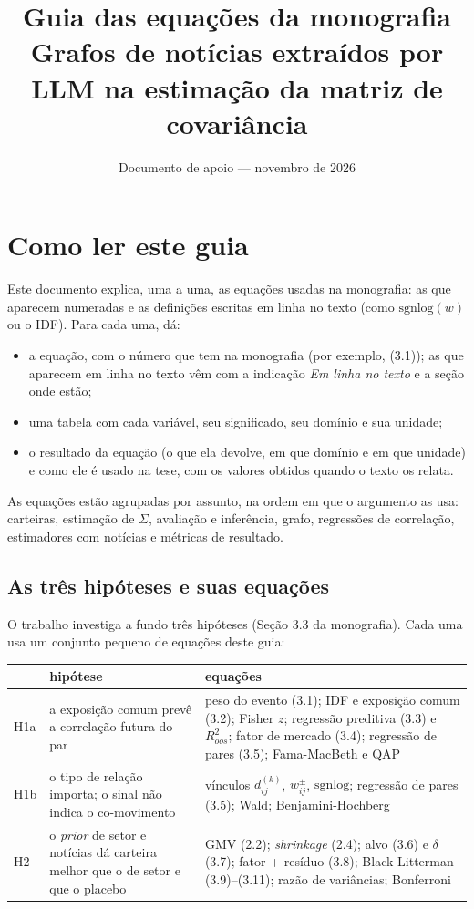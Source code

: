 \documentclass[11pt,a4paper]{article}
\title{Guia das equações da monografia\\[2pt]
\large Grafos de notícias extraídos por LLM na estimação da matriz de covariância}
\author{}
\date{Documento de apoio --- novembro de 2026}
\begin{document}
\maketitle

\tableofcontents
\clearpage

\section{Como ler este guia}

Este documento explica, uma a uma, as equações usadas na monografia: as que aparecem numeradas e as
definições escritas em linha no texto (como $\mathrm{sgnlog}(w)$ ou o IDF). Para cada uma, dá:
\begin{itemize}
  \item a equação, com o número que tem na monografia (por exemplo, (3.1)); as que aparecem em linha
        no texto vêm com a indicação \textit{Em linha no texto} e a seção onde estão;
  \item uma tabela com cada variável, seu significado, seu domínio e sua unidade;
  \item o resultado da equação (o que ela devolve, em que domínio e em que unidade) e como ele é usado
        na tese, com os valores obtidos quando o texto os relata.
\end{itemize}
As equações estão agrupadas por assunto, na ordem em que o argumento as usa: carteiras, estimação de
$\Sigma$, avaliação e inferência, grafo, regressões de correlação, estimadores com notícias e métricas
de resultado.

\subsection{As três hipóteses e suas equações}

O trabalho investiga a fundo três hipóteses (Seção 3.3 da monografia). Cada uma usa um conjunto pequeno
de equações deste guia:

\begin{center}
\small
\begin{tabularx}{\textwidth}{>{\raggedright\arraybackslash}p{1cm}>{\raggedright\arraybackslash}p{4.6cm}X}
\toprule
& hipótese & equações \\
\midrule
H1a & a exposição comum prevê a correlação futura do par & peso do evento (3.1); IDF e exposição comum (3.2); Fisher $z$; regressão preditiva (3.3) e $R^2_{oos}$; fator de mercado (3.4); regressão de pares (3.5); Fama-MacBeth e QAP \\
H1b & o tipo de relação importa; o sinal não indica o co-movimento & vínculos $d^{(k)}_{ij}$, $w^\pm_{ij}$, $\mathrm{sgnlog}$; regressão de pares (3.5); Wald; Benjamini-Hochberg \\
H2 & o \emph{prior} de setor e notícias dá carteira melhor que o de setor e que o placebo & GMV (2.2); \emph{shrinkage} (2.4); alvo (3.6) e $\delta$ (3.7); fator + resíduo (3.8); Black-Litterman (3.9)--(3.11); razão de variâncias; Bonferroni \\
\bottomrule
\end{tabularx}
\end{center}
\end{document}
